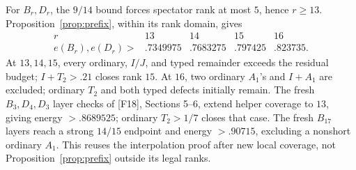\documentclass[11pt]{article}
\theoremstyle{definition}
\theoremstyle{remark}
\newcommand{\src}[1]{\textnormal{\textsf{[#1]}}}
\begin{document}
For \(B_r,D_r\), the \(9/14\) bound forces spectator rank
at most \(5\), hence \(r\geq13\).
Proposition~\ref{prop:prefix}, within its rank domain, gives
\[
\begin{array}{c|rrrr}
r&13&14&15&16\\ \hline
e(B_r),e(D_r)>&.7349975&.7683275&.797425&.823735.
\end{array}
\]
At \(13,14,15\), every ordinary, \(I/J\), and typed remainder
exceeds the residual budget; \(I+T_2>.21\) closes rank \(15\).
At \(16\), two ordinary \(A_1\)'s and \(I+A_1\) are excluded;
ordinary \(T_2\) and both typed defects initially remain.
The fresh \(B_3,D_4,D_3\) layer checks of \src{F18},
Sections 5--6, extend helper coverage to \(13\), giving
energy \(>.8689525\); ordinary \(T_2>1/7\) closes that case.
The fresh \(B_{17}\) layers reach a strong \(14/15\) endpoint
and energy \(>.90715\), excluding a nonshort ordinary \(A_1\).
This reuses the interpolation proof after new local coverage,
not Proposition~\ref{prop:prefix} outside its legal ranks.
\end{document}
